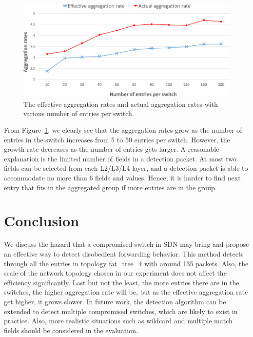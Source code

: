 \documentclass[conference]{IEEEtran}
\begin{document}
\begin{figure}[ht]
\centering
\includegraphics[width=1\linewidth]{figures/exp_entrynum_trend.pdf}
\caption{The effective aggregation rates and actual aggregation rates with various number of entries per switch.}
\label{exp_entrynum_trend}
\end{figure}

From Figure~\ref{exp_entrynum_trend}, we clearly see that the aggregation rates grow as the number of entries in the switch increases from 5 to 50 entries per switch. However, the growth rate decreases as the number of entries gets larger. A reasonable explanation is the limited number of fields in a detection packet. At most two fields can be selected from each L2/L3/L4 layer, and a detection packet is able to accommodate no more than 6 fields and values. Hence, it is harder to find next entry that fits in the aggregated group if more entries are in the group.

\section{Conclusion}
\label{conclusion}
We discuss the hazard that a compromised switch in SDN may bring and propose an effective way to detect disobedient forwarding behavior. This method detects through all the entries in topology fat\_tree\_4 with around 135 packets. Also, the scale of the network topology chosen in our experiment does not affect the efficiency significantly. Last but not the least, the more entries there are in the switches, the higher aggregation rate will be, but as the effective aggregation rate get higher, it grows slower. In future work, the detection algorithm can be extended to detect multiple compromised switches, which are likely to exist in practice. Also, more realistic situations such as wildcard and multiple match fields should be considered in the evaluation.

\end{document}
